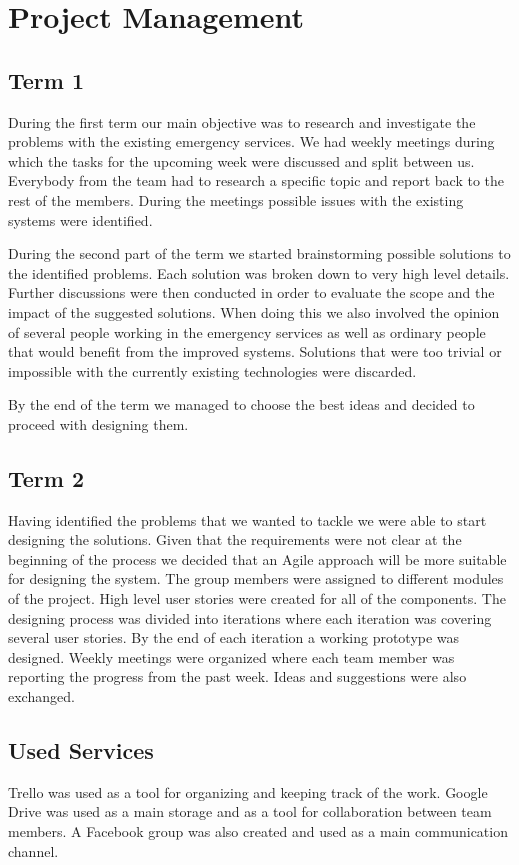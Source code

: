 \documentclass{article}
\begin{document}
\pagebreak
    \section{Project Management}
\subsection{Term 1}
During the first term our main objective was to research and investigate the problems with the existing emergency services. We had weekly meetings during which the tasks for the upcoming week were discussed and split between us. Everybody from the team had to research a specific topic and report back to the rest of the members.
During the meetings possible issues with the existing systems were identified.

During the second part of the term we started brainstorming possible solutions to the identified problems. Each solution was broken down to very high level details. Further discussions were then conducted in order to evaluate the scope and the impact of the suggested solutions. When doing this we also involved the opinion of several people working in the emergency services as well as ordinary people that would benefit from the improved systems. Solutions that were too trivial or impossible with the currently existing technologies were discarded.

By the end of the term we managed to choose the best ideas and decided to proceed with designing them.

\subsection{Term 2}

Having identified the problems that we wanted to tackle we were able to start designing the solutions.
Given that the requirements were not clear at the beginning of the process we decided that an Agile approach will be more suitable for designing the system. The group members were assigned to different modules of the project. High level user stories were created for all of the components. The designing process was divided into iterations where each iteration was covering several user stories. By the end of each iteration a working prototype was designed. Weekly meetings were organized where each team member was reporting the progress from the past week. Ideas and suggestions were also exchanged.

\subsection{Used Services}

Trello was used as a tool for organizing and keeping track of the work. Google Drive was used as a main storage and as a tool for collaboration between team members. A Facebook group was also created and used as a main communication channel.
\end{document}
